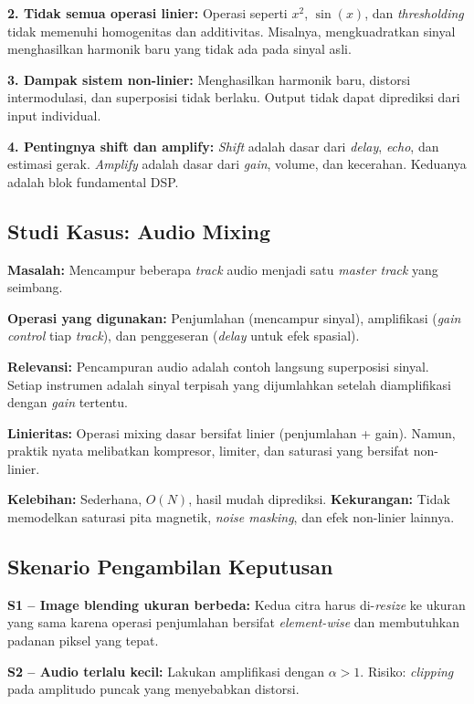 \documentclass[12pt,a4paper]{article}
\begin{document}
\textbf{2. Tidak semua operasi linier:} Operasi seperti $x^2$, $\sin(x)$, dan \textit{thresholding} tidak memenuhi homogenitas dan additivitas. Misalnya, mengkuadratkan sinyal menghasilkan harmonik baru yang tidak ada pada sinyal asli.

\textbf{3. Dampak sistem non-linier:} Menghasilkan harmonik baru, distorsi intermodulasi, dan superposisi tidak berlaku. Output tidak dapat diprediksi dari input individual.

\textbf{4. Pentingnya shift dan amplify:} \textit{Shift} adalah dasar dari \textit{delay}, \textit{echo}, dan estimasi gerak. \textit{Amplify} adalah dasar dari \textit{gain}, volume, dan kecerahan. Keduanya adalah blok fundamental DSP.

\subsection{Studi Kasus: Audio Mixing}

\textbf{Masalah:} Mencampur beberapa \textit{track} audio menjadi satu \textit{master track} yang seimbang.

\textbf{Operasi yang digunakan:} Penjumlahan (mencampur sinyal), amplifikasi (\textit{gain control} tiap \textit{track}), dan penggeseran (\textit{delay} untuk efek spasial).

\textbf{Relevansi:} Pencampuran audio adalah contoh langsung superposisi sinyal. Setiap instrumen adalah sinyal terpisah yang dijumlahkan setelah diamplifikasi dengan \textit{gain} tertentu.

\textbf{Linieritas:} Operasi mixing dasar bersifat linier (penjumlahan + gain). Namun, praktik nyata melibatkan kompresor, limiter, dan saturasi yang bersifat non-linier.

\textbf{Kelebihan:} Sederhana, $O(N)$, hasil mudah diprediksi. \textbf{Kekurangan:} Tidak memodelkan saturasi pita magnetik, \textit{noise masking}, dan efek non-linier lainnya.

\subsection{Skenario Pengambilan Keputusan}

\textbf{S1 -- Image blending ukuran berbeda:} Kedua citra harus di-\textit{resize} ke ukuran yang sama karena operasi penjumlahan bersifat \textit{element-wise} dan membutuhkan padanan piksel yang tepat.

\textbf{S2 -- Audio terlalu kecil:} Lakukan amplifikasi dengan $\alpha > 1$. Risiko: \textit{clipping} pada amplitudo puncak yang menyebabkan distorsi.
\end{document}
